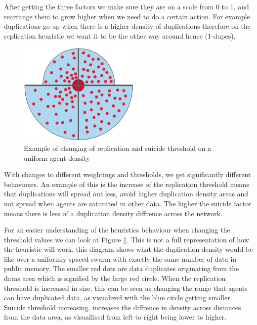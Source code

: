 \documentclass{UoYCSproject}
\begin{document}
After getting the three factors we make sure they are on a scale from 0 to 1, and rearrange them to grow higher when we need to do a certain action. 
For example duplications go up when there is a higher density of duplications therefore on the replication heuristic we want it to be the other way around hence (1-dupes).

\begin{figure}[htb]
\label{fig:changing}
\begin{center}
\centering
\includegraphics[height=5cm]{"./ExplanationImgs/planned_changes.png"}
\caption{Example of changing of replication and suicide threshold on a uniform agent density}
\end{center}
\end{figure}

With changes to different weightings and thresholds, we get significantly different behaviours. 
An example of this is the increase of the replication threshold means that duplications will spread out less, avoid higher duplication density areas and not spread when agents are saturated in other data. 
The higher the suicide factor means there is less of a duplication density diffrence across the network.

For an easier understanding of the heuristics behaviour when changing the threshold values we can look at Figure \ref{fig:changing}. 
This is not a full representation of how the heuristic will work, this diagram shows what the duplication density would be like over a uniformly spaced swarm with exactly the same number of data in public memory. 
The smaller red dots are data duplicates originating from the datas area which is signified by the large red circle. 
When the replication threshold is increased in size, this can be seen as changing the range that agents can have duplicated data, as visualized with the blue circle getting smaller. 
Suicide threshold increasing, increases the diffrence in density across distances from the data area, as visuallised from left to right being lower to higher.
\end{document}
